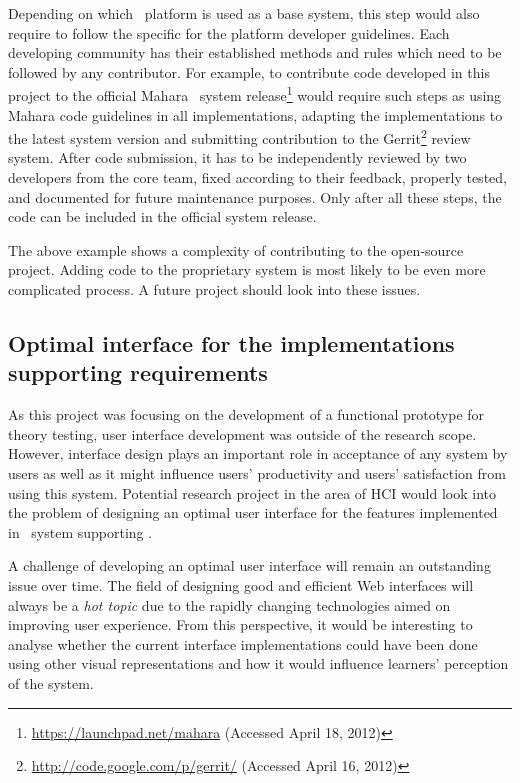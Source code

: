 Depending on which \ep~platform is used as a base system, this step would also
require to follow the specific for the platform developer guidelines. Each
developing community has their established methods and rules which need to be
followed by any contributor. For example, to contribute code developed in this
project to the official Mahara \ep~system
release\footnote{\url{https://launchpad.net/mahara} (Accessed April 18, 2012)}
would require such steps as using Mahara code guidelines in all implementations,
adapting the implementations to the latest system version and submitting
contribution to the Gerrit\footnote{\url{http://code.google.com/p/gerrit/}
(Accessed April 16, 2012)} review system. After code submission, it has to be
independently reviewed by two developers from the core team, fixed according to
their feedback, properly tested, and documented for future maintenance purposes.
Only after all these steps, the code can be included in the official system
release.

The above example shows a complexity of contributing to the open-source project.
Adding code to the proprietary system is most likely to be even more complicated
process. A future project should look into these issues.

\subsection[Optimal interface design]{Optimal interface for the implementations
supporting \LLLs requirements} 

As this project was focusing on the development of a functional prototype for
theory testing, user interface development was outside of the research scope.
However, interface design plays an important role in acceptance of any system by
users as well as it might influence users' productivity and users' satisfaction
from using this system. Potential research project in the area of HCI would look
into the problem of designing an optimal user interface for the features
implemented in \ep~system supporting \LLLsn.

A challenge of developing an optimal user interface will remain an outstanding
issue over time. The field of designing good and efficient Web interfaces will
always be a \textit{hot topic} due to the rapidly changing technologies aimed on
improving user experience. From this perspective, it would be interesting to
analyse whether the current interface implementations could have been done using
other visual representations and how it would influence learners' perception of
the system.

